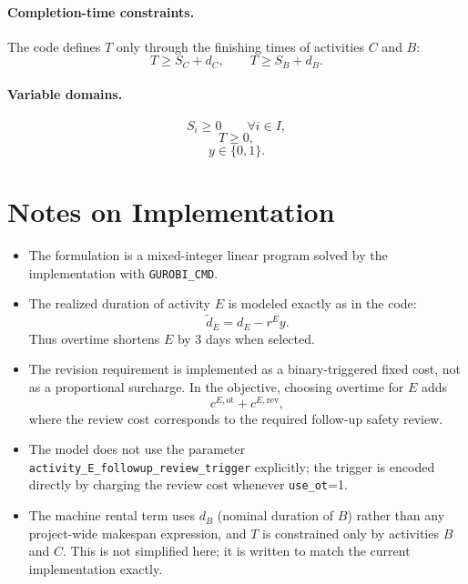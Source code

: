 \paragraph{Completion-time constraints.}
The code defines $T$ only through the finishing times of activities $C$ and $B$:
\[
T \ge S_C + d_C,
\qquad
T \ge S_B + d_B.
\]

\paragraph{Variable domains.}
\[
S_i \ge 0 \qquad \forall i\in I,
\]
\[
T \ge 0,
\]
\[
y \in \{0,1\}.
\]

\section*{Notes on Implementation}

\begin{itemize}
    \item The formulation is a mixed-integer linear program solved by the implementation with \texttt{GUROBI\_CMD}.
    \item The realized duration of activity $E$ is modeled exactly as in the code:
    \[
    \tilde d_E = d_E - r^E y.
    \]
    Thus overtime shortens $E$ by 3 days when selected.
    \item The revision requirement is implemented as a binary-triggered fixed cost, not as a proportional surcharge. In the objective, choosing overtime for $E$ adds
    \[
    c^{E,\text{ot}} + c^{E,\text{rev}},
    \]
    where the review cost corresponds to the required follow-up safety review.
    \item The model does not use the parameter \texttt{activity\_E\_followup\_review\_trigger} explicitly; the trigger is encoded directly by charging the review cost whenever \texttt{use\_ot}=1.
    \item The machine rental term uses $d_B$ (nominal duration of $B$) rather than any project-wide makespan expression, and $T$ is constrained only by activities $B$ and $C$. This is not simplified here; it is written to match the current implementation exactly.
\end{itemize}
